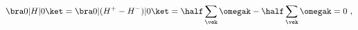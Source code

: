 \begin{equation}
  \bra 0 | H | 0 \ket = \bra 0 | (H ^+-H^-)| 0 \ket
  =\half \sum_{\vek} \omegak
   -\half \sum_{\vek} \omegak =0 \ ,
\end{equation}


